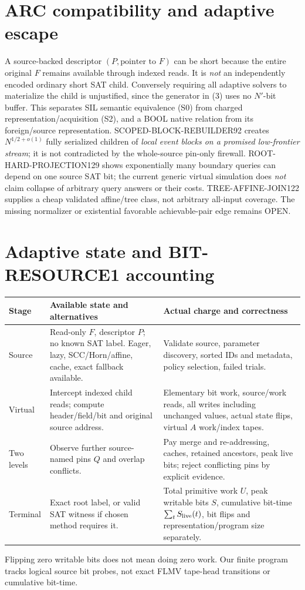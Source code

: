 \documentclass[11pt]{article}
\begin{document}
\section{ARC compatibility and adaptive escape}
A source-backed descriptor $(P,\text{pointer to }F)$ can be short because the entire original $F$ remains available through indexed reads. It is \emph{not} an independently encoded ordinary short SAT child. Conversely requiring all adaptive solvers to materialize the child is unjustified, since the generator in (3) uses no $N'$-bit buffer. This separates SIL semantic equivalence (S0) from charged representation/acquisition (S2), and a BOOL native relation from its foreign/source representation.
SCOPED-BLOCK-REBUILDER92 creates $N^{1/2+o(1)}$ fully serialized children of \emph{local event blocks on a promised low-frontier stream}; it is not contradicted by the whole-source pin-only firewall. ROOT-HARD-PROJECTION129 shows exponentially many boundary queries can depend on one source SAT bit; the current generic virtual simulation does \emph{not} claim collapse of arbitrary query answers or their costs. TREE-AFFINE-JOIN122 supplies a cheap validated affine/tree class, not arbitrary all-input coverage. The missing normalizer or existential favorable achievable-pair edge remains OPEN.
\section{Adaptive state and BIT-RESOURCE1 accounting}
\begin{center}\small
\begin{tabularx}{\linewidth}{p{.14\linewidth}X X}
\toprule
Stage & Available state and alternatives & Actual charge and correctness \\\midrule
Source & Read-only $F$, descriptor $P$; no known SAT label. Eager, lazy, SCC/Horn/affine, cache, exact fallback available. & Validate source, parameter discovery, sorted IDs and metadata, policy selection, failed trials. \\
Virtual & Intercept indexed child reads; compute header/field/bit and original source address. & Elementary bit work, source/work reads, all writes including unchanged values, actual state flips, virtual $A$ work/index tapes. \\
Two levels & Observe further source-named pins $Q$ and overlap conflicts. & Pay merge and re-addressing, caches, retained ancestors, peak live bits; reject conflicting pins by explicit evidence. \\
Terminal & Exact root label, or valid SAT witness if chosen method requires it. & Total primitive work $U$, peak writable bits $S$, cumulative bit-time $\sum_t S_{\rm live}(t)$, bit flips and representation/program size separately. \\
\bottomrule
\end{tabularx}\end{center}
Flipping zero writable bits does not mean doing zero work. Our finite program tracks logical source bit probes, not exact FLMV tape-head transitions or cumulative bit-time.
\end{document}
